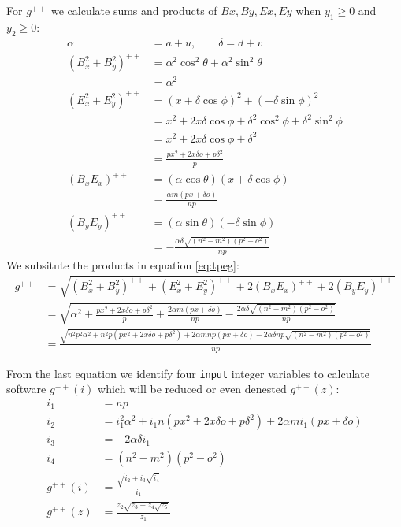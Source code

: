 \documentclass[11pt]{article}
\begin{document}
For $g^{++}$ we calculate sums and products of $Bx,By,Ex,Ey$ when $y_1 \geq 0$ and $y_2 \geq 0$:
\begin{align}
\alpha &= a + u, \qquad \delta = d + v\\
(B_x^2 + B_y^2)^{++} &= \alpha^2\cos^2\theta + \alpha^2\sin^2\theta \nonumber\\
 &= \alpha^2\\
(E_x^2 + E_y^2)^{++} &= (x + \delta\cos\phi)^2 + (-\delta\sin\phi)^2 \nonumber\\
 &= x^2 + 2x\delta\cos\phi + \delta^2\cos^2\phi + \delta^2\sin^2\phi \nonumber\\
 &= x^2 + 2x\delta\cos\phi + \delta^2 \nonumber\\
 &= \frac{px^2 + 2x\delta o + p\delta^2}{p}\\
(B_xE_x)^{++} &= (\alpha\cos\theta)(x + \delta\cos\phi) \nonumber\\
 &= \frac{\alpha m(px + \delta o)}{np} \\
(B_yE_y)^{++} &= (\alpha\sin\theta)(-\delta\sin\phi)\nonumber\\
 &= -\frac{\alpha \delta\sqrt{(n^2 - m^2)(p^2 - o^2)}}{np}
\end{align}
We subsitute the products in equation \ref{eq:tpeg}:
\begin{align}
g^{++} &= \sqrt{(B_x^2 + B_y^2)^{++} + (E_x^2 + E_y^2)^{++} + 2(B_xE_x)^{++} + 2(B_yE_y)^{++}}\nonumber\\
 &= \sqrt{
\alpha^2
+ \frac{px^2 + 2x\delta o + p\delta^2}p
+ \frac{2\alpha m(px + \delta o)}{np}
- \frac{2\alpha \delta\sqrt{(n^2 - m^2)(p^2 - o^2)}}{np}
}\nonumber\\
 &= \frac{\sqrt{
n^2p^2\alpha^2 + n^2p(px^2 + 2x\delta o + p\delta^2)
+ 2\alpha mnp(px + \delta o) - 2\alpha\delta np\sqrt{(n^2 - m^2)(p^2 - o^2)}
}}{np}
\end{align}

From the last equation we identify four \texttt{input} integer variables to calculate software $g^{++}(i)$ which will be reduced or even denested $g^{++}(z)$:
\begin{align}
i_1 &= np \\
i_2 &= i_1^2\alpha^2 + i_1n(px^2 + 2x\delta o + p\delta^2) + 2\alpha mi_1(px + \delta o)\\
i_3 &= - 2\alpha\delta i_1 \nonumber\\
i_4 &= (n^2 - m^2)(p^2 - o^2)\\
g^{++}(i) &= \frac{\sqrt{i_2 + i_3\sqrt{i_4}}}{i_1}\\
g^{++}(z) &= \frac{z_2\sqrt{z_3 + z_4\sqrt{z_5}}}{z_1}
\end{align}
\end{document}
